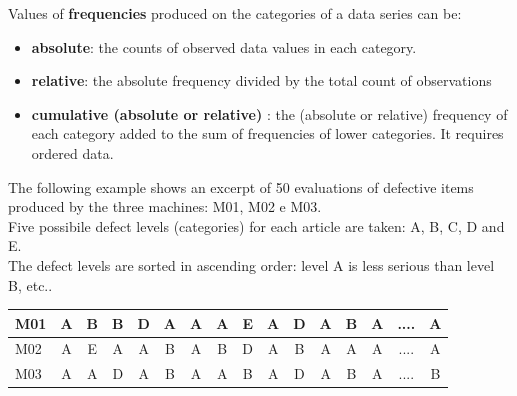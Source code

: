 \begin{frame}
  \vspace{0.75cm}
  Values of \textbf{frequencies} produced on the categories of a data series can be:
  \begin{itemize}
    \vspace{0.5cm}
    \item \textbf{absolute}:  the counts of observed data values in each category.
    \vspace{0.5cm}
    \item \textbf{relative}:  the  absolute frequency divided by the total count of observations
    \vspace{0.5cm}
    \item \textbf{cumulative (absolute or relative)} :  the  (absolute or relative) frequency of each category added to the sum of frequencies of lower categories. It requires ordered data.
  \end{itemize}
\end{frame}

\begin{frame}
  \vspace{0.5cm}
  The following example shows an excerpt of 50 evaluations of defective items produced by the three machines: M01, M02 e M03.\\
  \vspace*{.35cm}
  Five possibile defect levels (categories) for each article are taken: A, B, C, D and E.\\
  \vspace*{.35cm}
  The defect levels are sorted in ascending order: level A is less serious than level B, etc.. \\
  \vspace*{.35cm}
  \begin{tiny}
    \begin{center}
      \begin{tabular}{|l|c|c|c|c|c|c|c|c|c|c|c|c|c|c|c|}
        \hline      
        M01& A&B&B&D&A&A&A&E&A&D&A&B&A&....&A\\
        \hline
        M02&A&E&A&A&B&A&B&D&A&B&A&A&A&....&A\\
        \hline
        M03&A&A&D&A&B&A&A&B&A&D&A&B&A&....&B\\
        \hline
      \end{tabular}
   \end{center}
  \end{tiny}
\end{frame}

